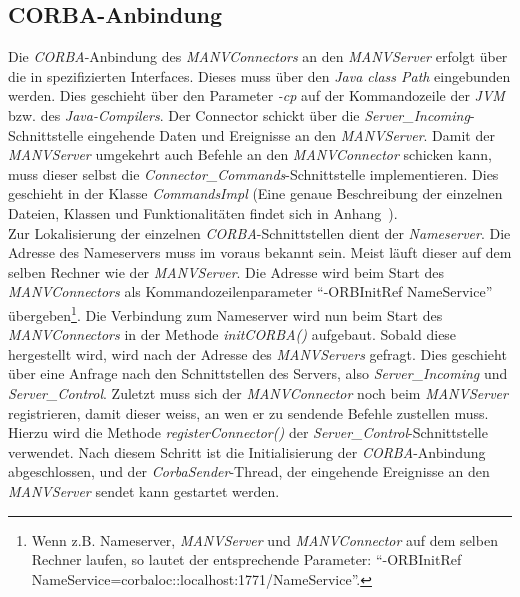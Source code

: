 \subsection{CORBA-Anbindung}
Die \emph{CORBA}-Anbindung des \emph{MANVConnectors} an den \emph{MANVServer} erfolgt über
die in \cite{Jan} spezifizierten Interfaces. Dieses muss über den \emph{Java class Path}
eingebunden werden. Dies geschieht über den Parameter \emph{-cp} auf der Kommandozeile
der \emph{JVM} bzw. des \emph{Java-Compilers}. Der Connector schickt über die 
\emph{Server\_Incoming}-Schnittstelle eingehende Daten und Ereignisse an den \emph{MANVServer}.
Damit der \emph{MANVServer} umgekehrt auch Befehle an den \emph{MANVConnector} schicken kann,
muss dieser selbst die \emph{Connector\_Commands}-Schnittstelle implementieren. Dies
geschieht in der Klasse \emph{CommandsImpl} (Eine
genaue Beschreibung der einzelnen Dateien, Klassen und Funktionalitäten findet sich in
Anhang~\label{anhang_beschreibung_software}).\\

Zur Lokalisierung der einzelnen \emph{CORBA}-Schnittstellen dient der \emph{Nameserver}.
Die Adresse des Nameservers muss im voraus bekannt sein. Meist läuft dieser auf dem selben Rechner
wie der \emph{MANVServer}. Die Adresse wird beim Start des \emph{MANVConnectors} als 
Kommandozeilenparameter "`-ORBInitRef NameService"' übergeben\footnote{Wenn z.B. Nameserver, \emph{MANVServer}
und \emph{MANVConnector} auf dem selben Rechner laufen, so lautet der entsprechende Parameter:
"`-ORBInitRef NameService=corbaloc::localhost:1771/NameService"'.}. Die Verbindung zum Nameserver
wird nun beim Start des \emph{MANVConnectors} in der Methode \emph{initCORBA()} aufgebaut. 
Sobald diese hergestellt wird, wird nach der Adresse des \emph{MANVServers} gefragt. Dies geschieht über
eine Anfrage nach den Schnittstellen des Servers, also \emph{Server\_Incoming} und \emph{Server\_Control}. 
Zuletzt muss sich der \emph{MANVConnector} noch beim \emph{MANVServer} registrieren, damit dieser
weiss, an wen er zu sendende Befehle zustellen muss. Hierzu wird die Methode \emph{registerConnector()}
der \emph{Server\_Control}-Schnittstelle verwendet. Nach diesem Schritt ist die Initialisierung der
\emph{CORBA}-Anbindung abgeschlossen, und der \emph{CorbaSender}-Thread, der eingehende Ereignisse
an den \emph{MANVServer} sendet kann gestartet werden.
